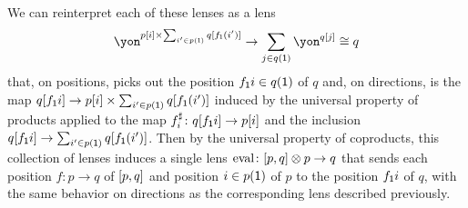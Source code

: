 \documentclass[Book-Poly]{subfiles}
\begin{document}
\begin{exercise}
\begin{solution}
We can reinterpret each of these lenses as a lens
\[
    \yon^{p[i] \times \sum_{i' \in p(\1)} q[f_\1(i')]} \to \sum_{j \in q(\1)} \yon^{q[j]} \iso q
\]
that, on positions, picks out the position $f_{\textsf{1}}i \in q(\textsf{1})$ of $q$ and, on directions, is the map $q[f_{\textsf{1}}i] \to p[i] \times \sum_{i' \in p(\textsf{1})} q[f_{\textsf{1}}(i')]$ induced by the universal property of products applied to the map $f^\sharp_i \colon q[f_{\textsf{1}}i] \to p[i]$ and the inclusion $q[f_{\textsf{1}}i] \to \sum_{i' \in p(\textsf{1})} q[f_{\textsf{1}}(i')]$.
Then by the universal property of coproducts, this collection of lenses induces a single lens $\mathrm{eval} \colon [p, q] \otimes p \to q$ that sends each position $f \colon p \to q$ of $[p,q]$ and position $i \in p(\textsf{1})$ of $p$ to the position $f_{\textsf{1}}i$ of $q$, with the same behavior on directions as the corresponding lens described previously.
\end{solution}
\end{exercise}
\end{document}

